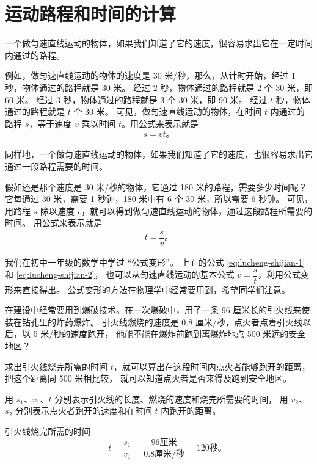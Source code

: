 \section{运动路程和时间的计算}\label{sec:3-5}

一个做匀速直线运动的物体，如果我们知道了它的速度，很容易求出它在一定时间内通过的路程。

例如，做匀速直线运动的物体的速度是 30 米/秒，那么，从计时开始，经过 1 秒，物体通过的路程就是 30 米。
经过 2 秒，物体通过的路程就是 2 个 30 米，即 60 米。
经过 3 秒，物体通过的路程就是 3 个 30 米，即 90 米。
经过 $t$ 秒，物体通过的路程就是 $t$ 个 30 米。
可见，做匀速直线运动的物体，在时间 $t$ 内通过的路程 $s$，等于速度 $v$ 乘以时间 $t$。用公式来表示就是
\begin{gather}
    s = vt \text{。} \label{eq:lucheng-shijian-1}
\end{gather}

同样地，一个做匀速直线运动的物体，如果我们知道了它的速度，也很容易求出它通过一段路程需要的时间。

假如还是那个速度是 30 米/秒的物体，它通过 180 米的路程，需要多少时间呢？
它每通过 30 米，需要 1 秒钟，180 米中有 6 个 30 米，所以需要 6 秒钟。
可见，用路程 $s$ 除以速度 $v$，就可以得到做匀速直线运动的物体，通过这段路程所需要的时间。
用公式来表示就是
\jiange
\begin{gather}
    t = \dfrac{s}{v} \text{。} \label{eq:lucheng-shijian-2}
\end{gather}

我们在初中一年级的数学中学过 “公式变形”。
上面的公式 \eqref{eq:lucheng-shijian-1} 和 \eqref{eq:lucheng-shijian-2}，
也可以从匀速直线运动的基本公式 $v = \dfrac{s}{t}$，利用公式变形来直接得出。
公式变形的方法在物理学中经常要用到，希望同学们注意。

\liti 在建设中经常要用到爆破技术。在一次爆破中，用了一条 96 厘米长的引火线来使装在钻孔里的炸药爆炸。
引火线燃烧的速度是 0.8 厘米/秒，点火者点着引火线以后，以 5 米/秒的速度跑开，
他能不能在爆炸前跑到离爆炸地点 500 米远的安全地区？

求出引火线烧完所需的时间 $t$，就可以算出在这段时间内点火者能够跑开的距离，把这个距离同 500 米相比较，
就可以知道点火者是否来得及跑到安全地区。

\jie 用 $s_1$、$v_1$、$t$ 分别表示引火线的长度、燃烧的速度和烧完所需要的时间，
用 $v_2$、$s_2$ 分别表示点火者跑开的速度和在时间 $t$ 内跑开的距离。

引火线烧完所需的时间
$$ \qquad t = \dfrac{s_1}{v_1} = \dfrac{96\text{厘米}}{0.8 \text{厘米/秒}} = 120 \text{秒。} $$

